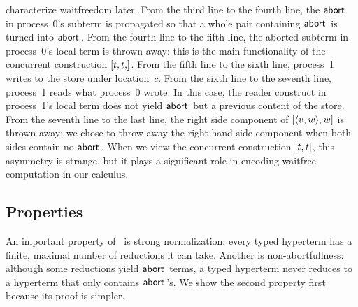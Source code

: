 \begin{example}
 characterize waitfreedom later.
 From the third line to the fourth line,
 the $\mathsf{abort\,}$ in process~0's subterm is propagated so that a whole pair
 containing $\mathsf{abort\,}$ is turned into $\mathsf{abort\,}$.
 From the fourth line to the fifth line,
 the aborted subterm in process~0's local term is thrown away: this is
 the main functionality of the concurrent construction $[{t,t,}]$.
 From the fifth line to the sixth line,
 process~1 writes to the store under location~$c$.
 From the sixth line to the seventh line,
 process~1 reads what process~0 wrote.
 In this case, the reader construct in process~1's local term does not
 yield $\mathsf{abort\,}$ but a previous content of the store.
 From the seventh line to the last line,
 the right side component of $[{\langle{v,w}\rangle,w}]$ is thrown away:
 we chose to throw away the right hand side component when both sides
 contain no $\mathsf{abort\,}$.  When we view the concurrent construction
 $[{t,t}]$, this asymmetry is strange, but it plays a significant
 role in encoding waitfree computation in our calculus.
\end{example}


\subsection{Properties}

An important property of
\lgd\, is strong normalization:
every typed hyperterm has a finite, maximal number of reductions it can
take.
Another is {non-abortfullness}: although some reductions yield
$\mathsf{abort\,}$ terms, a typed hyperterm never reduces to a hyperterm that only
contains $\mathsf{abort\,}$'s.  We show the second property first because its
proof is simpler.

